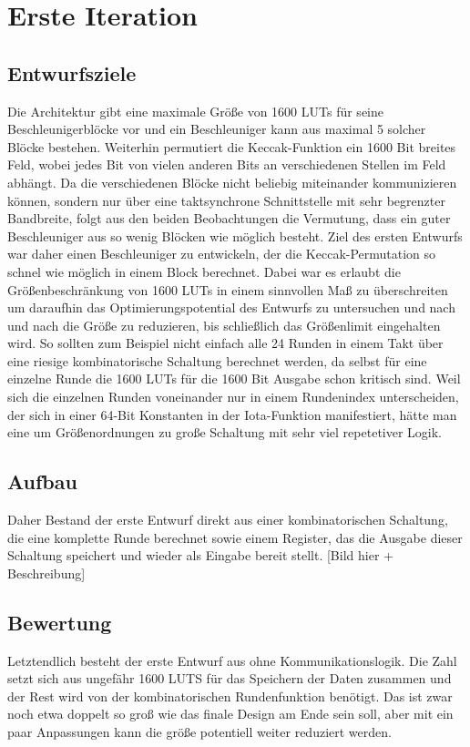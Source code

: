 \section{Erste Iteration}
\subsection{Entwurfsziele}

Die Architektur gibt eine maximale Größe von 1600 LUTs für seine Beschleunigerblöcke vor und ein Beschleuniger kann aus maximal 5 solcher Blöcke bestehen.
Weiterhin permutiert die Keccak-Funktion ein 1600 Bit breites Feld, wobei jedes Bit von vielen anderen Bits an verschiedenen Stellen im Feld abhängt.
Da die verschiedenen Blöcke nicht beliebig miteinander kommunizieren können, sondern nur über eine taktsynchrone Schnittstelle mit sehr begrenzter Bandbreite,
folgt aus den beiden Beobachtungen die Vermutung, dass ein guter Beschleuniger aus so wenig Blöcken wie möglich besteht.
Ziel des ersten Entwurfs war daher einen Beschleuniger zu entwickeln, der die Keccak-Permutation so schnel wie möglich in einem Block berechnet.
Dabei war es erlaubt die Größenbeschränkung von 1600 LUTs in einem sinnvollen Maß zu überschreiten um daraufhin das Optimierungspotential des Entwurfs zu untersuchen
und nach und nach die Größe zu reduzieren, bis schließlich das Größenlimit eingehalten wird.
So sollten zum Beispiel nicht einfach alle 24 Runden in einem Takt über eine riesige kombinatorische Schaltung berechnet werden,
da selbst für eine einzelne Runde die 1600 LUTs für die 1600 Bit Ausgabe schon kritisch sind.
Weil sich die einzelnen Runden voneinander nur in einem Rundenindex unterscheiden, der sich in einer 64-Bit Konstanten in der Iota-Funktion manifestiert,
hätte man eine um Größenordnungen zu große Schaltung mit sehr viel repetetiver Logik.

\subsection{Aufbau}
Daher Bestand der erste Entwurf direkt aus einer kombinatorischen Schaltung, die eine komplette Runde berechnet sowie einem Register,
das die Ausgabe dieser Schaltung speichert und wieder als Eingabe bereit stellt.
[Bild hier + Beschreibung]

\subsection{Bewertung}
Letztendlich besteht der erste Entwurf aus  ohne Kommunikationslogik.
Die Zahl setzt sich aus ungefähr 1600 LUTS für das Speichern der Daten zusammen und der Rest wird von der kombinatorischen Rundenfunktion benötigt.
Das ist zwar noch etwa doppelt so groß wie das finale Design am Ende sein soll, aber mit ein paar Anpassungen kann die größe potentiell weiter reduziert werden.

